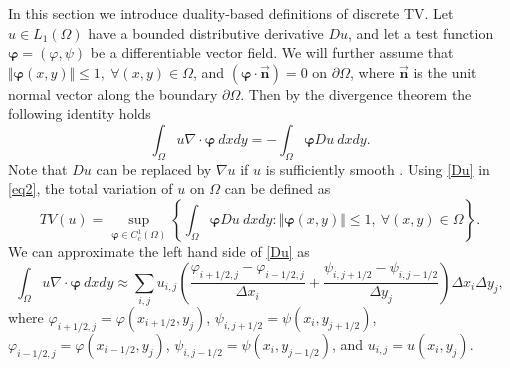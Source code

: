 \documentclass[reqno,a4paper,12pt]{amsart}
\begin{document}
In this section we introduce duality-based definitions of discrete TV. Let $u \in L_1(\Omega)$ have a bounded distributive derivative $Du$, and let a test function $\bm{\varphi} = (\varphi,  \psi)$ be a differentiable vector field. We will further assume that $ \Vert \bm{\varphi} (x,y) \Vert \leq 1, ~ \forall (x,y) \in \Omega$, and $( \bm{\varphi} \cdot \vec{\bm{n}} ) = 0$ on $\partial \Omega$, where $\vec{ \bm n}$ is the unit normal vector along the boundary $\partial \Omega$. Then by the divergence theorem the following identity holds
\begin{equation}
    \int_{\Omega} u \nabla \cdot \bm{\varphi} ~dx dy = -\int_{\Omega} \bm{\varphi} Du ~dx dy.
    \label{Du}
\end{equation}
Note that $Du$ can be replaced by $\nabla u$ if $u$ is sufficiently smooth \cite{folland}. Using \eqref{Du} in \eqref{eq2}, the total variation of $u$ on $\Omega$ can be defined as
\begin{equation}
    TV(u) = \sup_{\bm{\varphi} \in C_c^{1}(\Omega)} \left\{  \int_{\Omega} \bm{\varphi} Du ~dx dy : \Vert \bm{\varphi} (x,y) \Vert \leq 1, ~\forall (x,y) \in \Omega   \right\}.
    \label{TVu}
\end{equation}
We can approximate the left hand side of \eqref{Du} as 
\begin{equation}
\int_{\Omega} u \nabla \cdot \bm{\varphi} ~dx dy \approx \sum_{i,j} u_{i,j} \left(\frac{\varphi_{i+1/2,j} - \varphi_{i-1/2,j}}{\Delta x_i}  + \frac{\psi_{i,j+1/2} - \psi_{i,j-1/2}}{\Delta y_j} \right)\Delta x_i \Delta y_j, 
\label{eq31}
\end{equation}
where $\varphi_{i+1/2,j} = \varphi (x_{i+1/2},y_{j})$, $\psi_{i,j+1/2} = \psi (x_{i},y_{j+1/2})$, $\varphi_{i-1/2,j} = \varphi (x_{i-1/2},y_{j})$, $\psi_{i,j-1/2} = \psi (x_{i},y_{j-1/2})$, and $u_{i,j}=u(x_i,y_j)$.
\end{document}
